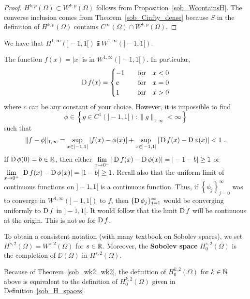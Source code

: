 \begin{proof}
$\displaystyle H^{k,p}(\Omega) \subset W^{k,p}(\Omega)$ follows from
Proposition~\ref{sob_WcontainsH}.  The converse inclusion comes from
Theorem~\ref{sob_Cinfty_dense} because $S$ in the definition of
$\displaystyle H^{k,p}(\Omega)$ contains
$\displaystyle C^\infty(\Omega) \cap W^{k,p}(\Omega)$.
\end{proof}

\begin{egg}
We have that
$\displaystyle H^{1,\infty}(]-1,1[) \subsetneqq W^{1,\infty}(]-1,1[)$.

The function $f(x) = |x|$ is in $\displaystyle W^{1,\infty}(]-1,1[)$.
In particular,
\[
\operatorname{D} f(x) =
\begin{cases}
-1 & \quad \text{for} \quad x <0 \\
c & \quad \text{for} \quad x =0 \\
1 & \quad \text{for} \quad x >0 \\
\end{cases}
\]
where $c$ can be any constant of your choice.  However, it is
impossible to find
\[
\phi \in
\left\{ g \in C^1(]-1,1[) :  \|g\|_{1,\infty} < \infty \right\}
\]
such that
\[
\| f- \phi \|_{1,\infty} = \sup_{x\in]-1,1[} |f(x)-\phi(x)|
+ \sup_{x\in]-1,1[} |\operatorname{D} f(x)-\operatorname{D} \phi(x)| < 1 \  .
\]
If $\operatorname{D} \phi(0)=b \in \mathbb{R}$, then either
$\displaystyle \lim_{x\rightarrow 0^-}|\operatorname{D} f(x)-\operatorname{D} \phi(x)|
= |-1-b| \geq 1$ or
$\displaystyle \lim_{x\rightarrow 0^+}|\operatorname{D} f(x)-\operatorname{D} \phi(x)| =|1-b| \geq 1$.
Recall also that the uniform limit of continuous functions on
$]-1,1[$ is a continuous function.  Thus, if
$\displaystyle \left\{\phi_j\right\}_{j=0}^\infty$ was to converge in
$\displaystyle W^{1,\infty}(]-1,1[)$ to $f$, then
$\displaystyle \{\operatorname{D} \phi_j\}_{j=1}^\infty$ would be converging
uniformly to $\operatorname{D} f$ in $]-1,1[$.  It would follow that the limit
$\operatorname{D} f$ will be continuous at the origin.  This is not so for $\operatorname{D} f$.
\end{egg}

\begin{defn}
To obtain a consistent notation (with many textbook on Sobolev spaces), we set
$\displaystyle H^{s,2}(\Omega) = W^{s,2}(\Omega)$ for $s \in \mathbb{R}$.
Moreover, the {\bfseries Sobolev space}
$\displaystyle H^{s,2}_0(\Omega)$ is the completion of
$\DD(\Omega)$ in $\displaystyle H^{s,2}(\Omega)$.
\end{defn}

Because of Theorem~\ref{sob_wk2_wk2}, the definition of 
$\displaystyle H^{k,2}_0(\Omega)$ for $k \in \mathbb{N}$ above is equivalent
to the definition of $\displaystyle H^{k,2}_0(\Omega)$ given in
Definition~\ref{sob_H_spaces}.

